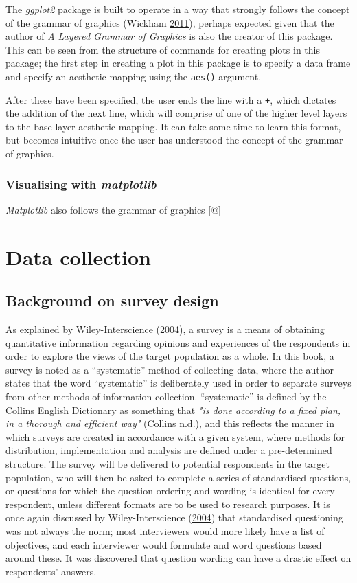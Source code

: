 \documentclass[
  11pt,
]{book}
\begin{document}
The \textit{ggplot2} package is built to operate in a way that strongly
follows the concept of the grammar of graphics (Wickham
\protect\hyperlink{ref-ggplot2}{2011}), perhaps expected given that the
author of \textit{A Layered Grammar of Graphics} is also the creator of
this package. This can be seen from the structure of commands for
creating plots in this package; the first step in creating a plot in
this package is to specify a data frame and specify an aesthetic mapping
using the \texttt{aes()} argument.

After these have been specified, the user ends the line with a
\texttt{+}, which dictates the addition of the next line, which will
comprise of one of the higher level layers to the base layer aesthetic
mapping. It can take some time to learn this format, but becomes
intuitive once the user has understood the concept of the grammar of
graphics.

\subsection{Visualising with \textit{matplotlib}}

\textit{Matplotlib} also follows the grammar of graphics {[}@{]}

\chapter{Data collection}

\section{Background on survey design}

As explained by Wiley-Interscience
(\protect\hyperlink{ref-wiley2004}{2004}), a survey is a means of
obtaining quantitative information regarding opinions and experiences of
the respondents in order to explore the views of the target population
as a whole. In this book, a survey is noted as a ``systematic'' method
of collecting data, where the author states that the word ``systematic''
is deliberately used in order to separate surveys from other methods of
information collection. ``systematic'' is defined by the Collins English
Dictionary as something that
\textit{"is done according to a fixed plan, in a thorough and efficient way"}
(Collins \protect\hyperlink{ref-collins-systematic}{n.d.}), and this
reflects the manner in which surveys are created in accordance with a
given system, where methods for distribution, implementation and
analysis are defined under a pre-determined structure. The survey will
be delivered to potential respondents in the target population, who will
then be asked to complete a series of standardised questions, or
questions for which the question ordering and wording is identical for
every respondent, unless different formats are to be used to research
purposes. It is once again discussed by Wiley-Interscience
(\protect\hyperlink{ref-wiley2004}{2004}) that standardised questioning
was not always the norm; most interviewers would more likely have a list
of objectives, and each interviewer would formulate and word questions
based around these. It was discovered that question wording can have a
drastic effect on respondents' answers.
\end{document}
